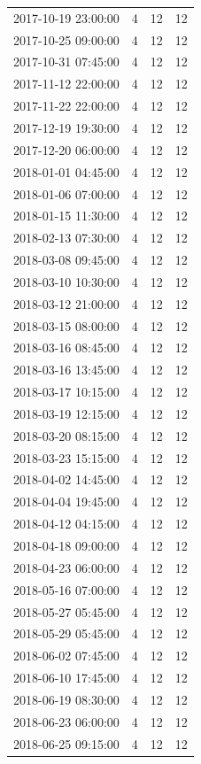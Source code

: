 \begin{tabular}{lrrr}
2017-10-19 23:00:00 & 4 & 12 & 12 \\
2017-10-25 09:00:00 & 4 & 12 & 12 \\
2017-10-31 07:45:00 & 4 & 12 & 12 \\
2017-11-12 22:00:00 & 4 & 12 & 12 \\
2017-11-22 22:00:00 & 4 & 12 & 12 \\
2017-12-19 19:30:00 & 4 & 12 & 12 \\
2017-12-20 06:00:00 & 4 & 12 & 12 \\
2018-01-01 04:45:00 & 4 & 12 & 12 \\
2018-01-06 07:00:00 & 4 & 12 & 12 \\
2018-01-15 11:30:00 & 4 & 12 & 12 \\
2018-02-13 07:30:00 & 4 & 12 & 12 \\
2018-03-08 09:45:00 & 4 & 12 & 12 \\
2018-03-10 10:30:00 & 4 & 12 & 12 \\
2018-03-12 21:00:00 & 4 & 12 & 12 \\
2018-03-15 08:00:00 & 4 & 12 & 12 \\
2018-03-16 08:45:00 & 4 & 12 & 12 \\
2018-03-16 13:45:00 & 4 & 12 & 12 \\
2018-03-17 10:15:00 & 4 & 12 & 12 \\
2018-03-19 12:15:00 & 4 & 12 & 12 \\
2018-03-20 08:15:00 & 4 & 12 & 12 \\
2018-03-23 15:15:00 & 4 & 12 & 12 \\
2018-04-02 14:45:00 & 4 & 12 & 12 \\
2018-04-04 19:45:00 & 4 & 12 & 12 \\
2018-04-12 04:15:00 & 4 & 12 & 12 \\
2018-04-18 09:00:00 & 4 & 12 & 12 \\
2018-04-23 06:00:00 & 4 & 12 & 12 \\
2018-05-16 07:00:00 & 4 & 12 & 12 \\
2018-05-27 05:45:00 & 4 & 12 & 12 \\
2018-05-29 05:45:00 & 4 & 12 & 12 \\
2018-06-02 07:45:00 & 4 & 12 & 12 \\
2018-06-10 17:45:00 & 4 & 12 & 12 \\
2018-06-19 08:30:00 & 4 & 12 & 12 \\
2018-06-23 06:00:00 & 4 & 12 & 12 \\
2018-06-25 09:15:00 & 4 & 12 & 12 \\

\end{tabular}
